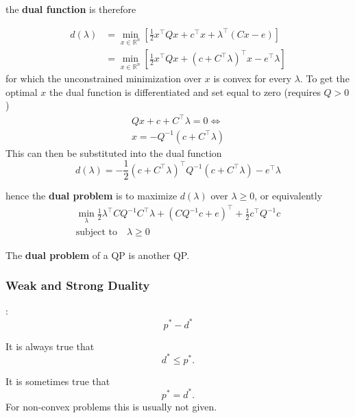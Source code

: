 the \textbf{dual function} is therefore

\begin{align*}
    d(\lambda) & = \min_{x\in\mathbb{R}^n}\left[\frac{1}{2}x^\top Q x + c^\top x +  \lambda^\top(Cx-e)\right]              \\
               & =  \min_{x\in\mathbb{R}^n}\left[\frac{1}{2}x^\top Q x + {(c+C^\top\lambda)}^\top x - e^\top\lambda\right]
\end{align*}
for which the unconstrained minimization over $x$ is convex for every $\lambda$. To get the optimal $x$ the dual function is differentiated and set equal to zero (requires $Q>0$)
\begin{gather*}
    Qx + c +C^\top\lambda=0 \Leftrightarrow \\
    x = -Q^{-1}(c + C^\top\lambda)
\end{gather*}
This can then be substituted into the dual function
\begin{equation*}
    d(\lambda) = -\frac{1}{2}{\left(c+C^\top\lambda\right)}^\top Q^{-1}\left(c+C^\top\lambda\right) -e^\top\lambda
\end{equation*}

hence the \textbf{dual problem} is to maximize $d(\lambda)$ over $\lambda\geq0$, or equivalently
\begin{gather*}
    \min_{\lambda} \frac{1}{2}\lambda^\top C Q^{-1}C^\top\lambda+{\left(CQ^{-1}c+e\right)}^\top + \frac{1}{2}c^\top Q^{-1}c \\
    \text{subject to}\quad \lambda \geq 0
\end{gather*}

The \textbf{dual problem} of a QP is another QP.

\subsubsection{Weak and Strong Duality}
:
\begin{equation*}
    p^* - d^*
\end{equation*}


It is always true that
\begin{equation*}
    d^* \leq p^*.
\end{equation*}

\newpar{}

It is sometimes true that
\begin{equation*}
    p^* = d^*.
\end{equation*}
For non-convex problems this is usually not given.

